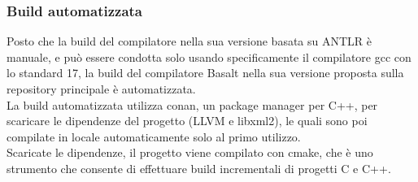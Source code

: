 \subsubsection{Build automatizzata}
Posto che la build del compilatore nella sua versione basata su ANTLR è manuale, e può essere condotta 
solo usando specificamente il compilatore gcc con lo standard 17, la build del compilatore Basalt
nella sua versione proposta sulla repository principale è automatizzata. \\

La build automatizzata utilizza conan, un package manager per C++, 
per scaricare le dipendenze del progetto (LLVM e libxml2), le quali sono 
poi compilate in locale automaticamente solo al primo utilizzo. \\

Scaricate le dipendenze, il progetto viene compilato con cmake, che è uno strumento 
che consente di effettuare build incrementali di progetti C e C++. \\